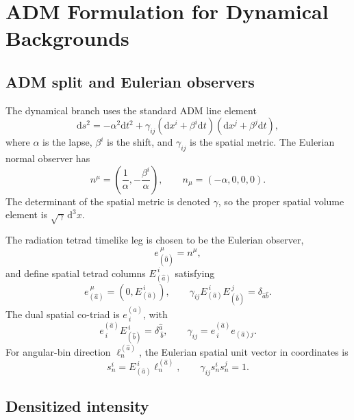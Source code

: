 \documentclass[11pt]{article}
\newcommand{\dd}{\mathrm{d}}
\begin{document}
\section{ADM Formulation for Dynamical Backgrounds}
\label{sec:adm}

\subsection{ADM split and Eulerian observers}

The dynamical branch uses the standard ADM line element
\begin{equation}
  \dd s^2 =
  -\alpha^2 \dd t^2
  +\gamma_{ij}(\dd x^i+\beta^i\dd t)(\dd x^j+\beta^j\dd t),
  \label{eq:adm_metric}
\end{equation}
where \(\alpha\) is the lapse, \(\beta^i\) is the shift, and
\(\gamma_{ij}\) is the spatial metric.  The Eulerian normal observer has
\begin{equation}
  n^\mu=\left(\frac{1}{\alpha},-\frac{\beta^i}{\alpha}\right),
  \qquad
  n_\mu=(-\alpha,0,0,0).
\end{equation}
The determinant of the spatial metric is denoted \(\gamma\), so the proper
spatial volume element is \(\sqrt{\gamma}\,\dd^3x\).

The radiation tetrad timelike leg is chosen to be the Eulerian observer,
\begin{equation}
  e_{(\hat{0})}^{\ \mu}=n^\mu ,
\end{equation}
and define spatial tetrad columns \(E_{(\hat{a})}^{\ i}\) satisfying
\begin{equation}
  e_{(\hat{a})}^{\ \mu}=(0,E_{(\hat{a})}^{\ i}),
  \qquad
  \gamma_{ij}E_{(\hat{a})}^{\ i}E_{(\hat{b})}^{\ j}
  = \delta_{\hat{a}\hat{b}} .
  \label{eq:spatial_tetrad}
\end{equation}
The dual spatial co-triad is \(e^{(\hat a)}_{\ i}\), with
\begin{equation}
  e^{(\hat a)}_{\ i}E_{(\hat b)}^{\ i}=\delta^{\hat a}_{\ \hat b},
  \qquad
  \gamma_{ij}=e^{(\hat a)}_{\ i}e_{(\hat a)j}.
  \label{eq:cotriad_def}
\end{equation}
For angular-bin direction \(\ell_n^{(\hat{a})}\), the Eulerian spatial unit
vector in coordinates is
\begin{equation}
  s^i_n = E_{(\hat{a})}^{\ i}\ell_n^{(\hat{a})},
  \qquad
  \gamma_{ij}s^i_n s^j_n=1 .
  \label{eq:eulerian_direction}
\end{equation}

\subsection{Densitized intensity}
\end{document}
